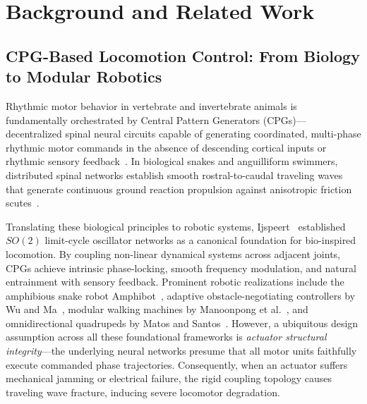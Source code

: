 \documentclass{iopjournal}
\begin{document}
\section{Background and Related Work}
\label{sec:related}

\subsection{CPG-Based Locomotion Control: From Biology to Modular Robotics}
Rhythmic motor behavior in vertebrate and invertebrate animals is fundamentally orchestrated by Central Pattern Generators (CPGs)—decentralized spinal neural circuits capable of generating coordinated, multi-phase rhythmic motor commands in the absence of descending cortical inputs or rhythmic sensory feedback~\cite{grillner2006,marder2001,delcomyn1980}. In biological snakes and anguilliform swimmers, distributed spinal networks establish smooth rostral-to-caudal traveling waves that generate continuous ground reaction propulsion against anisotropic friction scutes~\cite{dickinson2000,hirose1993}.

Translating these biological principles to robotic systems, Ijspeert~\cite{ijspeert2008} established $SO(2)$ limit-cycle oscillator networks as a canonical foundation for bio-inspired locomotion. By coupling non-linear dynamical systems across adjacent joints, CPGs achieve intrinsic phase-locking, smooth frequency modulation, and natural entrainment with sensory feedback. Prominent robotic realizations include the amphibious snake robot Amphibot~\cite{crespi2008}, adaptive obstacle-negotiating controllers by Wu and Ma~\cite{wu2010}, modular walking machines by Manoonpong et al.~\cite{manoonpong2007,manoonpong2013}, and omnidirectional quadrupeds by Matos and Santos~\cite{matos2014}. However, a ubiquitous design assumption across all these foundational frameworks is \textit{actuator structural integrity}—the underlying neural networks presume that all motor units faithfully execute commanded phase trajectories. Consequently, when an actuator suffers mechanical jamming or electrical failure, the rigid coupling topology causes traveling wave fracture, inducing severe locomotor degradation.
\end{document}
